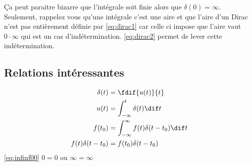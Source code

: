 Ça peut paraitre bizarre que l'intégrale soit finie alors que
$\delta(0) = \infty$.
Seulement, rappelez vous qu'une intégrale c'est une aire et que
l'aire d'un Dirac n'est pas entièrement définie par \eqref{eq:dirac1}
car celle ci impose que l'aire vaut $0 \cdot \infty$ qui est un cas
d'indétermination.
\eqref{eq:dirac2} permet de lever cette indétermination.

\subsection{Relations intéressantes}
\begin{align}
  \nonumber
  \delta(t) & = \fdif{u(t)}{t}\\
  \nonumber
  u(t) & = \int_{-\infty}^t \delta(t) \dif t\\
  \nonumber
  f(t_0) & = \int_{-\infty}^\infty f(t)\delta(t-t_0) \dif t\\
  \label{eq:infinf00}
  f(t) \delta(t-t_0) & = f(t_0)\delta(t-t_0)
\end{align}
\eqref{eq:infinf00} $0 = 0$ ou $\infty = \infty$


